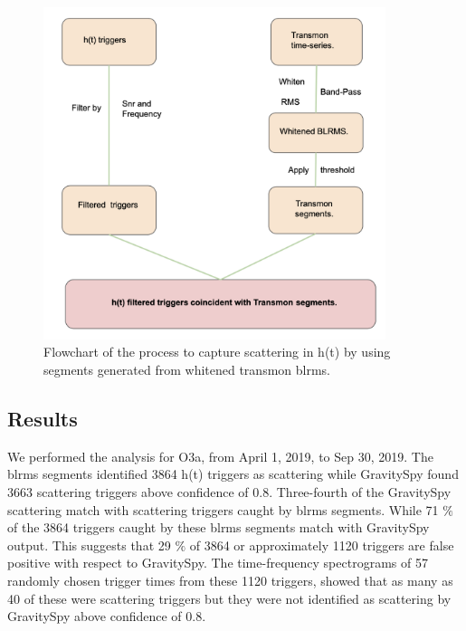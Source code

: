 \documentclass[12pt]{iopart}
\begin{document}
\begin{figure}[h]
    \centering
    \includegraphics[width=10cm]{flow.png}
    \caption{Flowchart of the process to capture scattering in h(t) by using segments generated from whitened transmon blrms.}
    \label{fig:flow}
\end{figure}

\subsection{Results}


\par
We performed the analysis for O3a, from April 1, 2019, to Sep 30, 2019. The blrms segments identified 3864 h(t) triggers as scattering while GravitySpy found 3663 scattering triggers above confidence of 0.8.  Three-fourth of the GravitySpy scattering match with scattering triggers caught by blrms segments. While 71 $\%$ of the 3864 triggers caught by these blrms segments match with GravitySpy output. This suggests that 29 $\%$ of 3864 or approximately 1120 triggers are false positive with respect to GravitySpy. 
The time-frequency spectrograms of 57 randomly chosen trigger times from these 1120 triggers, showed that as many as 40 of these were scattering triggers but they were not identified as scattering by GravitySpy above confidence of 0.8. 
\end{document}

